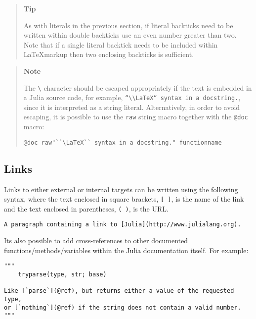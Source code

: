 \begin{quote}
\textbf{Tip}

As with literals in the previous section, if literal backticks need to be written within double backticks use an even number greater than two. Note that if a single literal backtick needs to be included within  \LaTeX  markup then two enclosing backticks is sufficient.

\end{quote}


\begin{quote}
\textbf{Note}

The \texttt{{\textbackslash}} character should be escaped appropriately if the text is embedded in a Julia source code, for example, \texttt{{\textquotedbl}``{\textbackslash}{\textbackslash}LaTeX`` syntax in a docstring.{\textquotedbl}}, since it is interpreted as a string literal. Alternatively, in order to avoid escaping, it is possible to use the \texttt{raw} string macro together with the \texttt{@doc} macro:


\begin{lstlisting}
@doc raw"``\LaTeX`` syntax in a docstring." functionname
\end{lstlisting}

\end{quote}


\hypertarget{10395937766942848638}{}


\subsection{Links}



Links to either external or internal targets can be written using the following syntax, where the text enclosed in square brackets, \texttt{[ ]}, is the name of the link and the text enclosed in parentheses, \texttt{( )}, is the URL.




\begin{lstlisting}
A paragraph containing a link to [Julia](http://www.julialang.org).
\end{lstlisting}



It{\textquotesingle}s also possible to add cross-references to other documented functions/methods/variables within the Julia documentation itself. For example:




\begin{verbatim}
"""
    tryparse(type, str; base)

Like [`parse`](@ref), but returns either a value of the requested type,
or [`nothing`](@ref) if the string does not contain a valid number.
"""
\end{verbatim}



